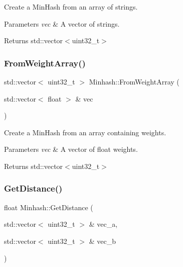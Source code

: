 Create a Min\+Hash from an array of strings. 


\begin{DoxyParams}{Parameters}
{\em vec} & A vector of strings. \\
\hline
\end{DoxyParams}
\begin{DoxyReturn}{Returns}
std\+::vector$<$uint32\+\_\+t$>$ 
\end{DoxyReturn}
\mbox{\label{classMinhash_a47a107b26e6fface715f5abfbb512484}} 
\subsubsection{\texorpdfstring{From\+Weight\+Array()}{FromWeightArray()}}
{\footnotesize\ttfamily std\+::vector$<$ uint32\+\_\+t $>$ Minhash\+::\+From\+Weight\+Array (\begin{DoxyParamCaption}\item[{std\+::vector$<$ float $>$ \&}]{vec }\end{DoxyParamCaption})}



Create a Min\+Hash from an array containing weights. 


\begin{DoxyParams}{Parameters}
{\em vec} & A vector of float weights. \\
\hline
\end{DoxyParams}
\begin{DoxyReturn}{Returns}
std\+::vector$<$uint32\+\_\+t$>$ 
\end{DoxyReturn}
\mbox{\label{classMinhash_a40dd607c20fa7c8059a3fb3d0c81ba0a}} 
\subsubsection{\texorpdfstring{Get\+Distance()}{GetDistance()}}
{\footnotesize\ttfamily float Minhash\+::\+Get\+Distance (\begin{DoxyParamCaption}\item[{std\+::vector$<$ uint32\+\_\+t $>$ \&}]{vec\+\_\+a,  }\item[{std\+::vector$<$ uint32\+\_\+t $>$ \&}]{vec\+\_\+b }\end{DoxyParamCaption})}



